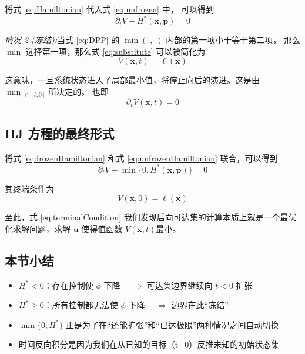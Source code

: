 \documentclass[11pt]{ctexrep}
\begin{document}
将式 \ref{eq:Hamiltonian} 代入式 \ref{eq:unfrozen} 中， 可以得到
\begin{equation}\label{eq:unfrozenHamiltonian}
    \partial_t V + H^*(\mathbf{x},\mathbf{p}) = 0
\end{equation}


\emph{情况 2 (冻结):}当式 \ref{eq:DPP} 的 $\min(\cdot, \cdot)$ 内部的第一项小于等于第二项，
那么 $\min$ 选择第一项，那么式 \ref{eq:substitute} 可以被简化为
\begin{equation}\label{eq:frozen}
    V(\mathbf{x},t) = \ell(\mathbf{x})
\end{equation}

这意味，一旦系统状态进入了局部最小值，将停止向后的演进。这是由 $\min_{\tau \in [t,0]}$所决定的。
也即
\begin{equation}\label{eq:frozenHamiltonian}
    \partial_t V(\mathbf{x},t) = 0
\end{equation}
\subsection{HJ 方程的最终形式}
将式 \ref{eq:frozenHamiltonian} 和式 \ref{eq:unfrozenHamiltonian} 联合，可以得到
\begin{equation}\label{eq:HJ}
    \partial_t V + \min\{0, H^*(\mathbf{x},\mathbf{p})\} = 0
\end{equation}

其终端条件为
\begin{equation}\label{eq:terminalCondition}
    V(\mathbf{x},0) = \ell(\mathbf{x})
\end{equation}

至此，式 \ref{eq:terminalCondition} 我们发现后向可达集的计算本质上就是一个最优化求解问题，求解 $\mathbf{u}$ 使得值函数 $V(\mathbf{x},t)$最小。

\subsection{本节小结}

\begin{itemize}
\item $H^* < 0$：存在控制使 $\phi$ 下降 $\quad \Rightarrow$ 可达集边界继续向 $t<0$ 扩张
\item $H^* \ge 0$：所有控制都无法使 $\phi$ 下降 $\quad \Rightarrow$ 边界在此“冻结”
\item $\min\{0, H^*\}$ 正是为了在“还能扩张”和“已达极限”两种情况之间自动切换
\item 时间反向积分是因为我们在从已知的目标（t=0）反推未知的初始状态集
\end{itemize}
\end{document}

